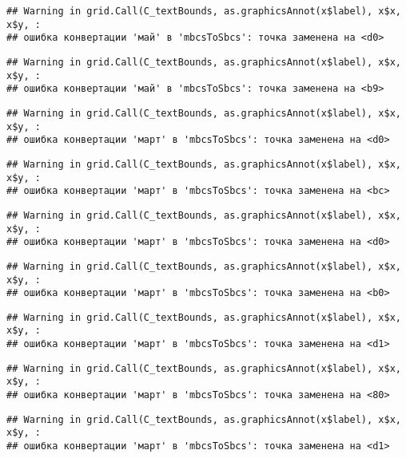 \documentclass[
]{article}
\begin{document}
\begin{verbatim}
## Warning in grid.Call(C_textBounds, as.graphicsAnnot(x$label), x$x, x$y, :
## ошибка конвертации 'май' в 'mbcsToSbcs': точка заменена на <d0>
\end{verbatim}

\begin{verbatim}
## Warning in grid.Call(C_textBounds, as.graphicsAnnot(x$label), x$x, x$y, :
## ошибка конвертации 'май' в 'mbcsToSbcs': точка заменена на <b9>
\end{verbatim}

\begin{verbatim}
## Warning in grid.Call(C_textBounds, as.graphicsAnnot(x$label), x$x, x$y, :
## ошибка конвертации 'март' в 'mbcsToSbcs': точка заменена на <d0>
\end{verbatim}

\begin{verbatim}
## Warning in grid.Call(C_textBounds, as.graphicsAnnot(x$label), x$x, x$y, :
## ошибка конвертации 'март' в 'mbcsToSbcs': точка заменена на <bc>
\end{verbatim}

\begin{verbatim}
## Warning in grid.Call(C_textBounds, as.graphicsAnnot(x$label), x$x, x$y, :
## ошибка конвертации 'март' в 'mbcsToSbcs': точка заменена на <d0>
\end{verbatim}

\begin{verbatim}
## Warning in grid.Call(C_textBounds, as.graphicsAnnot(x$label), x$x, x$y, :
## ошибка конвертации 'март' в 'mbcsToSbcs': точка заменена на <b0>
\end{verbatim}

\begin{verbatim}
## Warning in grid.Call(C_textBounds, as.graphicsAnnot(x$label), x$x, x$y, :
## ошибка конвертации 'март' в 'mbcsToSbcs': точка заменена на <d1>
\end{verbatim}

\begin{verbatim}
## Warning in grid.Call(C_textBounds, as.graphicsAnnot(x$label), x$x, x$y, :
## ошибка конвертации 'март' в 'mbcsToSbcs': точка заменена на <80>
\end{verbatim}

\begin{verbatim}
## Warning in grid.Call(C_textBounds, as.graphicsAnnot(x$label), x$x, x$y, :
## ошибка конвертации 'март' в 'mbcsToSbcs': точка заменена на <d1>
\end{verbatim}
\end{document}
